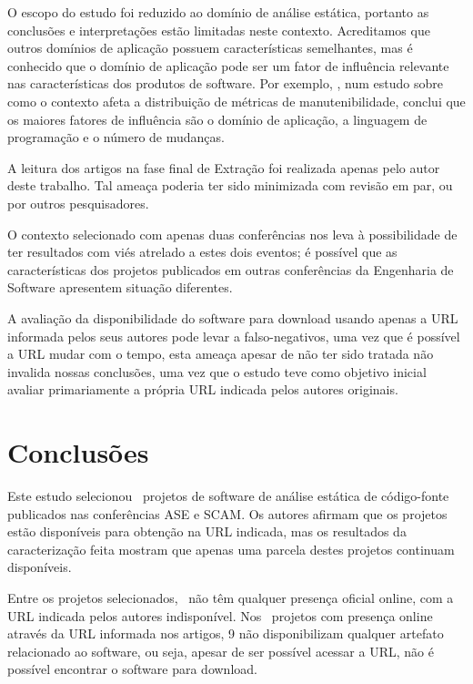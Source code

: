 O escopo do estudo foi reduzido ao domínio de análise estática, portanto as
conclusões e interpretações estão limitadas neste contexto. Acreditamos que
outros domínios de aplicação possuem características semelhantes, mas é
conhecido que o domínio de aplicação pode ser um fator de influência relevante nas
características dos produtos de software.
Por exemplo, , num estudo sobre como o contexto afeta
a distribuição de métricas de manutenibilidade, conclui que os maiores fatores
de influência são o domínio de aplicação, a linguagem de programação e o número
de mudanças.

A leitura dos artigos na fase final de Extração foi realizada
apenas pelo autor deste trabalho. Tal ameaça poderia ter sido minimizada com
revisão em par, ou por outros pesquisadores.

O contexto selecionado com apenas duas conferências nos leva à possibilidade de
ter resultados com viés atrelado a estes dois eventos; é possível que as
características dos projetos publicados em outras conferências da Engenharia de
Software apresentem situação diferentes.

A avaliação da disponibilidade do software para download usando apenas a URL
informada pelos seus autores pode levar a falso-negativos, uma vez que é
possível a URL mudar com o tempo, esta ameaça apesar de não ter sido
tratada não invalida nossas conclusões, uma vez que o estudo teve como objetivo
inicial avaliar primariamente a própria URL indicada pelos autores originais.


\section{Conclusões} \label{estudo1:conclusoes} %

Este estudo selecionou \SoftwareCount \ projetos de software de análise estática de
código-fonte publicados nas conferências ASE e SCAM.
Os autores afirmam que os projetos estão disponíveis para obtenção na URL
indicada, mas os resultados da caracterização feita mostram que apenas uma
parcela destes projetos continuam disponíveis.

Entre os projetos selecionados, \SoftwareUrlNotAvailableCount \ não têm qualquer presença oficial online,
com a URL indicada pelos autores indisponível.
Nos \SoftwareUrlAvailableCount \ projetos com presença online através da URL informada nos artigos, 9 não
disponibilizam qualquer artefato relacionado ao software, ou seja, apesar de
ser possível acessar a URL, não é possível encontrar o software para download.

